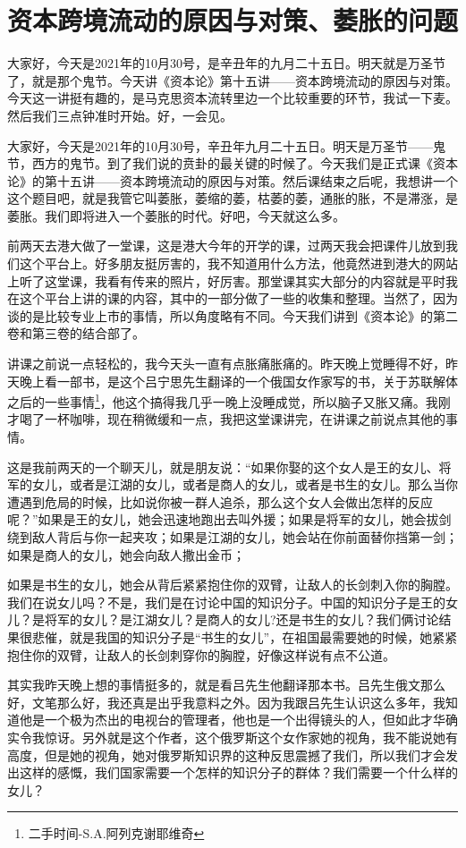 \documentclass[UTF8, 12pt, a4paper]{ctexrep}
\begin{document}
\section{资本跨境流动的原因与对策、萎胀的问题}

大家好，今天是2021年的10月30号，是辛丑年的九月二十五日。明天就是万圣节了，就是那个鬼节。今天讲《资本论》第十五讲——资本跨境流动的原因与对策。今天这一讲挺有趣的，是马克思资本流转里边一个比较重要的环节，我试一下麦。然后我们三点钟准时开始。好，一会见。

大家好，今天是2021年的10月30号，辛丑年九月二十五日。明天是万圣节——鬼节，西方的鬼节。到了我们说的贲卦的最关键的时候了。今天我们是正式课《资本论》的第十五讲——资本跨境流动的原因与对策。然后课结束之后呢，我想讲一个这个题目吧，就是我管它叫萎胀，萎缩的萎，枯萎的萎，通胀的胀，不是滞涨，是萎胀。我们即将进入一个萎胀的时代。好吧，今天就这么多。

前两天去港大做了一堂课，这是港大今年的开学的课，过两天我会把课件儿放到我们这个平台上。好多朋友挺厉害的，我不知道用什么方法，他竟然进到港大的网站上听了这堂课，我看有传来的照片，好厉害。那堂课其实大部分的内容就是平时我在这个平台上讲的课的内容，其中的一部分做了一些的收集和整理。当然了，因为谈的是比较专业上市的事情，所以角度略有不同。今天我们讲到《资本论》的第二卷和第三卷的结合部了。

讲课之前说一点轻松的，我今天头一直有点胀痛胀痛的。昨天晚上觉睡得不好，昨天晚上看一部书，是这个吕宁思先生翻译的一个俄国女作家写的书，关于苏联解体之后的一些事情\footnote{二手时间-S.A.阿列克谢耶维奇}，他这个搞得我几乎一晚上没睡成觉，所以脑子又胀又痛。我刚才喝了一杯咖啡，现在稍微缓和一点，我把这堂课讲完，在讲课之前说点其他的事情。

这是我前两天的一个聊天儿，就是朋友说：“如果你娶的这个女人是王的女儿、将军的女儿，或者是江湖的女儿，或者是商人的女儿，或者是书生的女儿。那么当你遭遇到危局的时候，比如说你被一群人追杀，那么这个女人会做出怎样的反应呢？”如果是王的女儿，她会迅速地跑出去叫外援；如果是将军的女儿，她会拔剑绕到敌人背后与你一起夹攻；如果是江湖的女儿，她会站在你前面替你挡第一剑；如果是商人的女儿，她会向敌人撒出金币；

如果是书生的女儿，她会从背后紧紧抱住你的双臂，让敌人的长剑刺入你的胸膛。我们在说女儿吗？不是，我们是在讨论中国的知识分子。中国的知识分子是王的女儿？是将军的女儿？是江湖女儿？是商人的女儿?还是书生的女儿？我们俩讨论结果很悲催，就是我国的知识分子是“书生的女儿”，在祖国最需要她的时候，她紧紧抱住你的双臂，让敌人的长剑刺穿你的胸膛，好像这样说有点不公道。

其实我昨天晚上想的事情挺多的，就是看吕先生他翻译那本书。吕先生俄文那么好，文笔那么好，我还真是出乎我意料之外。因为我跟吕先生认识这么多年，我知道他是一个极为杰出的电视台的管理者，他也是一个出得镜头的人，但如此才华确实令我惊讶。另外就是这个作者，这个俄罗斯这个女作家她的视角，我不能说她有高度，但是她的视角，她对俄罗斯知识界的这种反思震撼了我们，所以我们才会发出这样的感慨，我们国家需要一个怎样的知识分子的群体？我们需要一个什么样的女儿？
\end{document}
